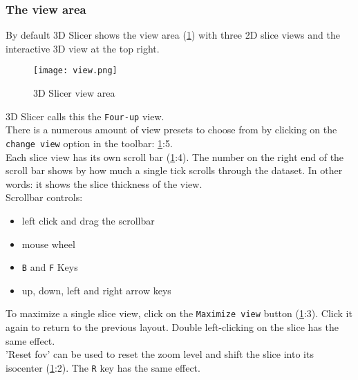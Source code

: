 \pagebreak

\subsubsection{The view area}\label{sec:view_area}
By default 3D Slicer shows the view area (\cref{fig:4upview}) with three 2D slice views and the interactive 3D view at the top right.\\
\noindent
\begin{figure}[h!] %
	\centerline{ %
		\texttt{[image: view.png]}}
	\caption{3D Slicer view area}\label{fig:4upview}
\end{figure}

\noindent
3D Slicer calls this the \texttt{Four-up} view.\\

\noindent
There is a numerous amount of view presets to choose from by clicking on the \texttt{change view} option in the toolbar: \cref{fig:4upview}:5.\\

\noindent
Each slice view has its own scroll bar (\cref{fig:4upview}:4).
The number on the right end of the scroll bar shows by how much a single tick scrolls through the dataset.
In other words: it shows the slice thickness of the view.\\
\noindent
Scrollbar controls:
\begin{itemize}
	\item left click and drag the scrollbar
	\item mouse wheel
	\item \texttt{B} and \texttt{F} Keys
	\item up, down, left and right arrow keys
\end{itemize}

\noindent
To maximize a single slice view, click on the \texttt{Maximize view} button (\cref{fig:4upview}:3). Click it again to return to the previous layout. Double left-clicking on the slice has the same effect.\\

\noindent
'Reset \gls{fov}' can be used to reset the zoom level and shift the slice into its isocenter (\cref{fig:4upview}:2). The \texttt{R} key has the same effect.\\

